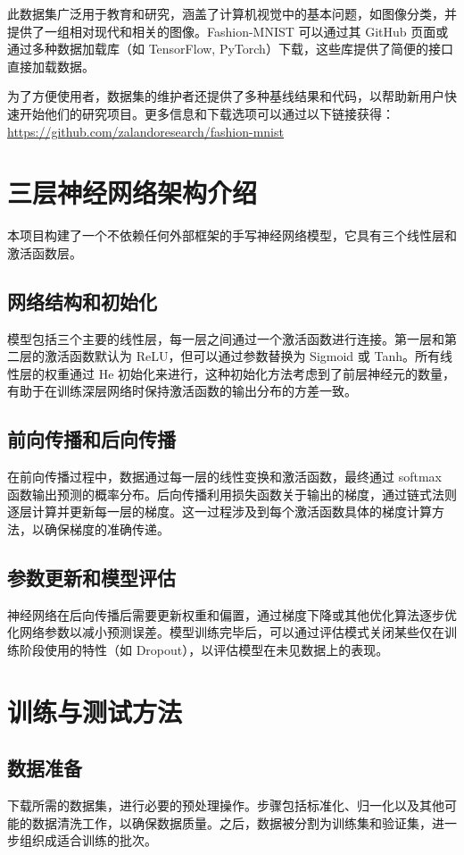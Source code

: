 \documentclass[a4paper,12pt]{article}
\begin{document}
此数据集广泛用于教育和研究，涵盖了计算机视觉中的基本问题，如图像分类，并提供了一组相对现代和相关的图像。Fashion-MNIST 可以通过其 GitHub 页面或通过多种数据加载库（如 TensorFlow, PyTorch）下载，这些库提供了简便的接口直接加载数据。

为了方便使用者，数据集的维护者还提供了多种基线结果和代码，以帮助新用户快速开始他们的研究项目。更多信息和下载选项可以通过以下链接获得：\url{https://github.com/zalandoresearch/fashion-mnist}

\section{三层神经网络架构介绍}

本项目构建了一个不依赖任何外部框架的手写神经网络模型，它具有三个线性层和激活函数层。

\subsection{网络结构和初始化}
模型包括三个主要的线性层，每一层之间通过一个激活函数进行连接。第一层和第二层的激活函数默认为 ReLU，但可以通过参数替换为 Sigmoid 或 Tanh。所有线性层的权重通过 He 初始化来进行，这种初始化方法考虑到了前层神经元的数量，有助于在训练深层网络时保持激活函数的输出分布的方差一致。

\subsection{前向传播和后向传播}
在前向传播过程中，数据通过每一层的线性变换和激活函数，最终通过 softmax 函数输出预测的概率分布。后向传播利用损失函数关于输出的梯度，通过链式法则逐层计算并更新每一层的梯度。这一过程涉及到每个激活函数具体的梯度计算方法，以确保梯度的准确传递。

\subsection{参数更新和模型评估}
神经网络在后向传播后需要更新权重和偏置，通过梯度下降或其他优化算法逐步优化网络参数以减小预测误差。模型训练完毕后，可以通过评估模式关闭某些仅在训练阶段使用的特性（如 Dropout），以评估模型在未见数据上的表现。


\section{训练与测试方法}


\subsection{数据准备}
下载所需的数据集，进行必要的预处理操作。步骤包括标准化、归一化以及其他可能的数据清洗工作，以确保数据质量。之后，数据被分割为训练集和验证集，进一步组织成适合训练的批次。
\end{document}
